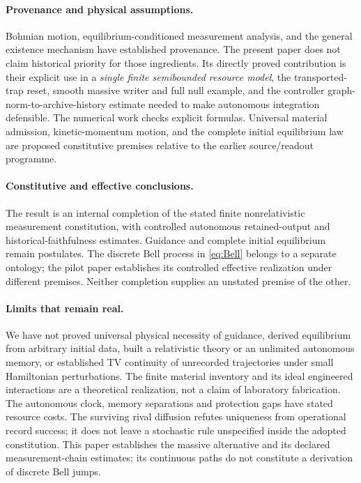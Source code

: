 \documentclass[11pt]{article}
\theoremstyle{definition}\newtheorem{assumption}[theorem]{Constitutive assumption}
\theoremstyle{remark}\newtheorem{remark}[theorem]{Remark}
\begin{document}
\paragraph{Provenance and physical assumptions.}
Bohmian motion, equilibrium-conditioned measurement analysis, and the general existence mechanism have established provenance. The present paper does not claim historical priority for those ingredients. Its directly proved contribution is their explicit use in a \emph{single finite semibounded resource model}, the transported-trap reset, smooth massive writer and full null example, and the controller graph-norm-to-archive-history estimate needed to make autonomous integration defensible. The numerical work checks explicit formulas. Universal material admission, kinetic-momentum motion, and the complete initial equilibrium law are proposed constitutive premises relative to the earlier source/readout programme.

\paragraph{Constitutive and effective conclusions.}
The result is an internal completion of the stated finite nonrelativistic measurement constitution, with controlled autonomous retained-output and historical-faithfulness estimates. Guidance and complete initial equilibrium remain postulates. The discrete Bell process in \eqref{eq:Bell} belongs to a separate ontology; the pilot paper \cite{Pilot} establishes its controlled effective realization under different premises. Neither completion supplies an unstated premise of the other.

\paragraph{Limits that remain real.}
We have not proved universal physical necessity of guidance, derived equilibrium from arbitrary initial data, built a relativistic theory or an unlimited autonomous memory, or established TV continuity of unrecorded trajectories under small Hamiltonian perturbations. The finite material inventory and its ideal engineered interactions are a theoretical realization, not a claim of laboratory fabrication. The autonomous clock, memory separations and protection gaps have stated resource costs. The surviving rival diffusion refutes uniqueness from operational record success; it does not leave a stochastic rule unspecified inside the adopted constitution. This paper establishes the massive alternative and its declared measurement-chain estimates; its continuous paths do not constitute a derivation of discrete Bell jumps.
\end{document}
